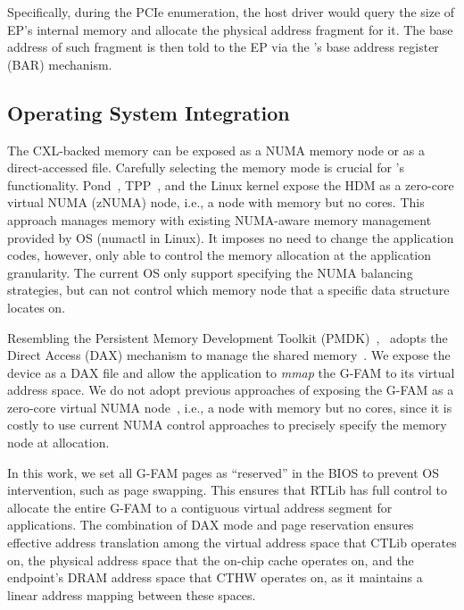 Specifically, during the PCIe enumeration, the host driver would query the size of EP's internal memory and allocate the physical address fragment for it. The base address of such fragment is then told to the EP via the \cxlio's base address register (BAR) mechanism. 

\fi

\subsection{Operating System Integration}       \label{subsec:system_integration}

\ifx\undefined\stale
The CXL-backed memory can be exposed as a NUMA memory node or as a direct-accessed file. Carefully selecting the memory mode is crucial for \name's functionality. Pond~\cite{pond}, TPP~\cite{tpp_asplos23}, and the Linux kernel expose the HDM as a zero-core virtual NUMA (zNUMA) node, i.e., a node with memory but no cores. This approach manages memory with existing NUMA-aware memory management provided by OS (numactl in Linux). It imposes no need to change the application codes, however, only able to control the memory allocation at the application granularity. The current OS only support specifying the NUMA balancing strategies, but can not control which memory node that a specific data structure locates on. 
\fi



Resembling the Persistent Memory Development Toolkit (PMDK)~\cite{pmdk}, \name~adopts the Direct Access (DAX) mechanism to manage the shared memory~\cite{directcxl, cxl_anns_atc23, partial_sosp23}. We expose the device as a DAX file and allow the application to \textit{mmap} the G-FAM to its virtual address space. We do not adopt previous approaches of exposing the G-FAM as a zero-core virtual NUMA node~\cite{pond, tpp_asplos23}, i.e., a node with memory but no cores, since it is costly to use current NUMA control approaches to precisely specify the memory node at allocation. 

In this work, we set all G-FAM pages as ``reserved'' in the BIOS to prevent OS intervention, such as page swapping. This ensures that RTLib has full control to allocate the entire G-FAM to a contiguous virtual address segment for applications. 
The combination of DAX mode and page reservation ensures effective address translation among the virtual address space that CTLib operates on, the physical address space that the on-chip cache operates on, and the endpoint's DRAM address space that CTHW operates on, as it maintains a linear address mapping between these spaces. 

